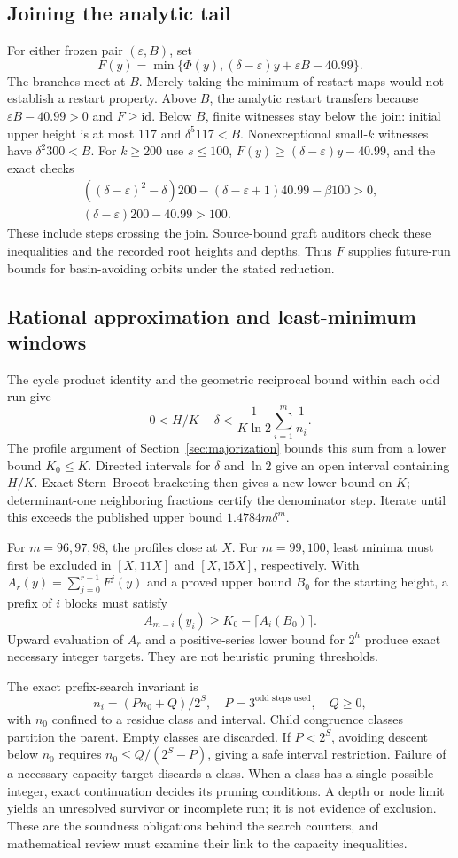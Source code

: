 \documentclass[11pt]{article}
\theoremstyle{definition}\newtheorem{definition}[theorem]{Definition}
\newcommand{\eps}{\varepsilon}
\begin{document}
\subsection{Joining the analytic tail}
For either frozen pair $(\eps,B)$, set
\[
 F(y)=\min\{\Phi(y),(\delta-\eps)y+\eps B-40.99\}.
\]
The branches meet at $B$. Merely taking the minimum of restart maps would not establish a restart property. Above $B$, the analytic restart transfers because $\eps B-40.99>0$ and $F\ge\mathrm{id}$. Below $B$, finite witnesses stay below the join: initial upper height is at most $117$ and $\delta^5 117<B$. Nonexceptional small-$k$ witnesses have $\delta^2 300<B$. For $k\ge200$ use $s\le100$, $F(y)\ge(\delta-\eps)y-40.99$, and the exact checks
\begin{gather*}
 ((\delta-\eps)^2-\delta)200-(\delta-\eps+1)40.99-\beta100>0,\\
 (\delta-\eps)200-40.99>100.
\end{gather*}
These include steps crossing the join. Source-bound graft auditors check these inequalities and the recorded root heights and depths. Thus $F$ supplies future-run bounds for basin-avoiding orbits under the stated reduction.

\subsection{Rational approximation and least-minimum windows}
The cycle product identity and the geometric reciprocal bound within each odd run give
\[
 0<H/K-\delta<\frac1{K\ln2}\sum_{i=1}^m\frac1{n_i}.
\]
The profile argument of Section~\ref{sec:majorization} bounds this sum from a lower bound $K_0\le K$. Directed intervals for $\delta$ and $\ln2$ give an open interval containing $H/K$. Exact Stern--Brocot bracketing then gives a new lower bound on $K$; determinant-one neighboring fractions certify the denominator step. Iterate until this exceeds the published upper bound $1.4784m\delta^m$.

For $m=96,97,98$, the profiles close at $X$. For $m=99,100$, least minima must first be excluded in $[X,11X]$ and $[X,15X]$, respectively. With $A_r(y)=\sum_{j=0}^{r-1}F^j(y)$ and a proved upper bound $B_0$ for the starting height, a prefix of $i$ blocks must satisfy
\[
 A_{m-i}(y_i)\ge K_0-\lceil A_i(B_0)\rceil.
\]
Upward evaluation of $A_r$ and a positive-series lower bound for $2^h$ produce exact necessary integer targets. They are not heuristic pruning thresholds.

The exact prefix-search invariant is
\[
 n_i=(Pn_0+Q)/2^S,\quad P=3^{\text{odd steps used}},\quad Q\ge0,
\]
with $n_0$ confined to a residue class and interval. Child congruence classes partition the parent. Empty classes are discarded. If $P<2^S$, avoiding descent below $n_0$ requires $n_0\le Q/(2^S-P)$, giving a safe interval restriction. Failure of a necessary capacity target discards a class. When a class has a single possible integer, exact continuation decides its pruning conditions. A depth or node limit yields an unresolved survivor or incomplete run; it is not evidence of exclusion. These are the soundness obligations behind the search counters, and mathematical review must examine their link to the capacity inequalities.
\end{document}
